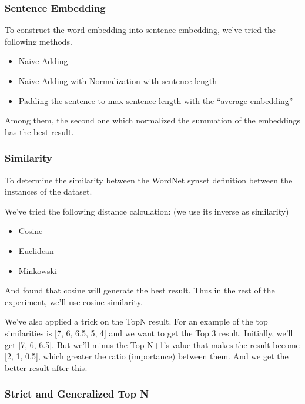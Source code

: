 \subsubsection*{Sentence Embedding}
\label{sec:sentence_embedding}

To construct the word embedding into sentence embedding, we've tried the following methods.

\begin{itemize}
    \item Naive Adding
    \item Naive Adding with Normalization with sentence length
    \item Padding the sentence to max sentence length with the “average embedding”
\end{itemize}

Among them, the second one which normalized the summation of the embeddings has the best result.

\subsubsection*{Similarity}
\label{sec:similarity}

To determine the similarity between the WordNet synset definition between the instances of the dataset.

We've tried the following distance calculation: (we use its inverse as similarity)

\begin{itemize}
    \item Cosine
    \item Euclidean
    \item Minkowski
\end{itemize}

And found that cosine will generate the best result. Thus in the rest of the experiment, we'll use cosine similarity.

We've also applied a trick on the TopN result. For an example of the top similarities is [7, 6, 6.5, 5, 4] and we want to get the Top 3 result. Initially, we'll get [7, 6, 6.5]. But we'll minus the Top N+1's value that makes the result become [2, 1, 0.5], which greater the ratio (importance) between them. And we get the better result after this.

\subsubsection*{Strict and Generalized Top N}
\label{sec:strict_and_generalized_top_n}

